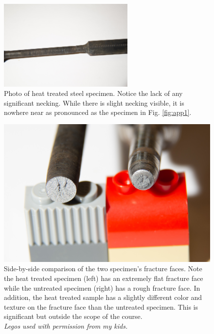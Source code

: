 \documentclass[12pt]{article}
\begin{document}
\begin{figure}[h]
    \centering
    \includegraphics[width=0.6\textwidth]{ST-1.jpg}
    \caption{Photo of heat treated steel specimen. Notice the lack of any significant necking. While there is slight necking visible, it is nowhere near as pronounced as the specimen in Fig. \ref{fig:app1}.}
    \label{fig:app2}
\end{figure}

\begin{figure}[h]
    \centering
    \includegraphics[width=1\textwidth]{ST-2.jpg}
    \caption{Side-by-side comparison of the two specimen's fracture faces. Note the heat treated specimen (left) has an extremely flat fracture face while the untreated specimen (right) has a rough fracture face. In addition, the heat treated sample has a slightly different color and texture on the fracture face than the untreated specimen. This is significant but outside the scope of the course.\\ \textit{Legos used with permission from my kids.}}
    \label{fig:app3}
\end{figure}
\end{document}
